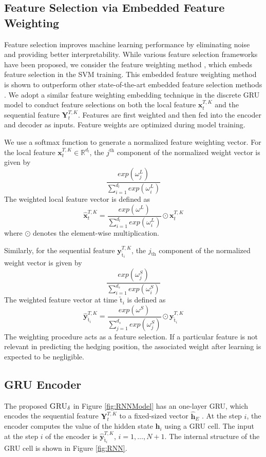 \documentclass[letterpaper,12pt,titlepage,oneside,final]{book}
\numberwithin{equation}{section}
\theoremstyle{definition}
\newcommand{\model}{\textsc{GRU}_\delta}
\newcommand{\vx}{\mathbf{x}}
\newcommand{\vy}{\mathbf{y}}
\newcommand{\Real}{\mathbb{R}}
\newcommand{\vh}{\mathbf{h}}
\newcommand{\nt}{\breve{\text{t}}}
\begin{document}
\subsection{Feature Selection via Embedded Feature Weighting}
 Feature selection improves machine learning performance by eliminating noise and providing better interpretability. While various feature selection frameworks have  been proposed,  we consider the feature weighting method \citep{tayal2014primal}, which embeds feature selection  in the SVM training.
  This  embedded feature weighting method is shown to outperform other state-of-the-art embedded feature selection methods \citep{tayal2014primal}.
We adopt a similar feature weighting embedding technique in the discrete GRU model to conduct feature selections on both the local feature $\vx^{T,K}_{t}$ and the sequential feature $\mathbf{Y}_{t}^{T,K}$.
Features are first weighted and then fed into the encoder and decoder as inputs. Feature weights are optimized during model training.

We  use a softmax function to generate a normalized  feature weighting vector. For the local feature $\vx^{T,K}_{t}  \in \Real^{d_l}$, the $j^\text{th}$ component of the normalized weight vector is given by
\[
\frac{exp(\omega^L_j)}{\sum_{i=1}^{d_l} exp(\omega^L_i)}
\]
The weighted  local feature vector is defined as
\[\widehat{\vx}^{T,K}_{t}=\frac{exp(\omega^L)}{\sum_{i=1}^{d_l} exp(\omega^L_i)}\odot \vx^{T,K}_{t} \] 
where $\odot$ denotes the element-wise multiplication.

Similarly,
for the sequential feature $\mathbf{y}_{\nt_i}^{T,K}$,  the $j_\text{th}$ component of the normalized weight vector is given by
\[
\frac{exp(\omega^S_j)}{\sum_{i=1}^{d_s} exp(\omega^S_i)}
\]
  The weighted feature vector at time  $\nt_i$ is defined as
\[
\widehat{\vy}_{\nt_i}^{T,K} =\frac{exp(\omega^S)}{\sum_{j=1}^{d_s} exp(\omega^S_j)} \odot \mathbf{y}_{\nt_i}^{T,K}
\]
{The weighting procedure acts as a feature selection.}
If a  particular feature is not relevant in predicting the hedging position, the associated weight after learning  is expected to be negligible.


\subsection{GRU Encoder}
The  proposed $\model$  in Figure \ref{fig:RNNModel} has an one-layer GRU, which encodes the sequential feature $\mathbf{Y}_{t}^{T,K}$ to  a fixed-sized vector
$\mathbf{\widehat{h}}_E$ .
At the  step $i$,  the encoder computes the value of the hidden state $\vh_{i}$ using a GRU cell. The input at the step $i$ of the encoder is $\widehat{\vy}^{T,K}_{\nt_{i}}$,  $i=1,\ldots,N+1$.
The internal structure of the GRU cell is shown in Figure \ref{fig:RNN}.
\end{document}
